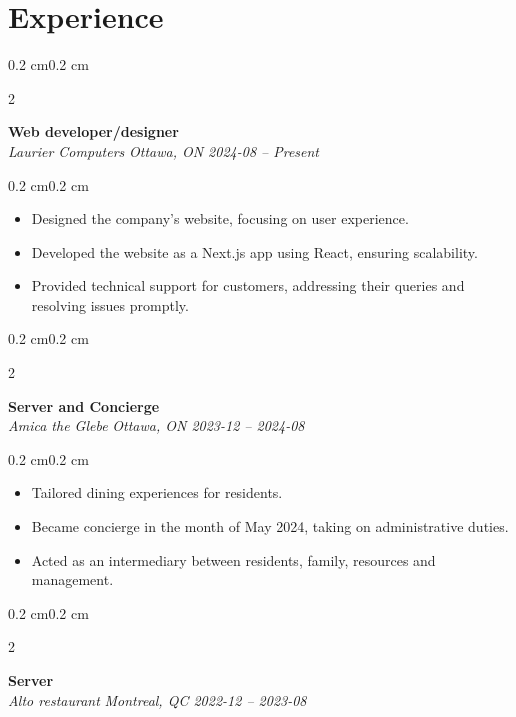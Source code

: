 \documentclass[10pt, letterpaper]{article}
\newenvironment{highlights}{%
    \begin{itemize}[
        topsep=0.10 cm,%
        parsep=0.10 cm,%
        partopsep=0pt,%
        itemsep=0pt,%
        leftmargin=0.4 cm + 10pt%
    ]
}{%
    \end{itemize}%
}
\newenvironment{onecolentry}{%
    \begin{adjustwidth}{0.2 cm}{0.2 cm}%
}{%
    \end{adjustwidth}%
}
\newenvironment{twocolentry}[2][]{%
    \begin{onecolentry}%
    \def\secondColumn{#2}%
    \begin{paracol}{2}%
}{%
    \switchcolumn%
    \raggedleft%
    \secondColumn%
    \end{paracol}%
    \end{onecolentry}%
}
\begin{document}
\section{Experience}
\begin{twocolentry}{\textit{ Ottawa, ON \hspace{0.5em}2024-08 -- Present }}
    \textbf{ Web developer/designer }\\
    \textit{ Laurier Computers }
\end{twocolentry}
\vspace{0.10 cm}
\begin{onecolentry}
    \begin{highlights}
        \item Designed the company’s website, focusing on user experience.
        \item Developed the website as a Next.js app using React, ensuring scalability.
        \item Provided technical support for customers, addressing their queries and resolving issues promptly.
    \end{highlights}
\end{onecolentry}
\vspace{0.2 cm}
\begin{twocolentry}{\textit{ Ottawa, ON \hspace{0.5em}2023-12 -- 2024-08 }}
    \textbf{ Server and Concierge }\\
    \textit{ Amica the Glebe }
\end{twocolentry}
\vspace{0.10 cm}
\begin{onecolentry}
    \begin{highlights}
        \item Tailored dining experiences for residents.
        \item Became concierge in the month of May 2024, taking on administrative duties.
        \item Acted as an intermediary between residents, family, resources and management.
    \end{highlights}
\end{onecolentry}
\vspace{0.2 cm}
\begin{twocolentry}{\textit{ Montreal, QC \hspace{0.5em}2022-12 -- 2023-08 }}
    \textbf{ Server }\\
    \textit{ Alto restaurant }
\end{twocolentry}
\end{document}
